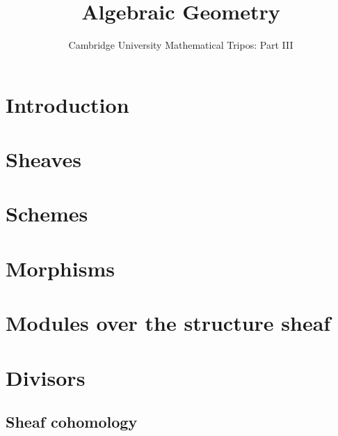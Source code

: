 \documentclass{article}
\title{Algebraic Geometry}
\author{Cambridge University Mathematical Tripos: Part III}
\begin{document}
\maketitle

\tableofcontentsnewpage{}


\section{Introduction}

\section{Sheaves}

\section{Schemes}

\section{Morphisms}

\section{Modules over the structure sheaf}

\section{Divisors}

\subsection{Sheaf cohomology}

\end{document}

